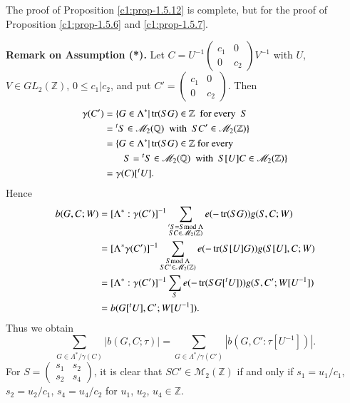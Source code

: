 The proof of Proposition \ref{c1:prop-1.5.12} is complete, but for the proof
of Proposition \ref{c1:prop-1.5.6} and \ref{c1:prop-1.5.7}.


\bigskip
\noindent
{\bf Remark on Assumption (*).}
Let $C=U^{-1}\left(\begin{smallmatrix} c_{1} & 0\\ 0 & c_{2}
\end{smallmatrix}\right)V^{-1}$ with $U$, $V\in GL_{2}(\mathbb{Z})$,
$0\leq c_{1}|c_{2}$, and put $C'=\left(\begin{smallmatrix} c_{1} &
  0\\ 0 & c_{2}\end{smallmatrix}\right)$. Then
\begin{align*}
\gamma(C') &= \{G\in\Lambda^{\ast}|\operatorname{tr}(SG)\in\mathbb{Z} \text{ \ for
  every \ } S\\
&={}^{t}S\in\mathscr{M}_{2}(\mathbb{Q})\text{ \ with \ }
SC'\in\mathscr{M}_{2}(\mathbb{Z})\}\\
&= \{G\in\Lambda^{\ast}|\operatorname{tr}(SG)\in\mathbb{Z}\text{  for every  }\\
&\qquad S={}^{t}S\in\mathscr{M}_{2}(\mathbb{Q})\text{ \ with \ }
S[U]C\in\mathscr{M}_{2}(\mathbb{Z})\}\\
&= \gamma(C)[{}^{t}U].
\end{align*}
Hence\pageoriginale
\begin{align*}
b(G,C;W) &=
[\Lambda^{\ast}:\gamma(C')]^{-1}\sum_{\substack{{}^{t}S=S\rm{mod} \;\Lambda\\ SC\in
\mathscr{M}_{2}(\mathbb{Z})}}e(-\operatorname{tr}(SG))g(S,C;W)\\
&=
[\Lambda^{\ast}\gamma(C')]^{-1}\sum_{\substack{S\rm{mod} \;\Lambda\\ SC'\in\mathscr{M}_{2}(\mathbb{Z})}}e(-\operatorname{tr}(S[U]G))g(S[U],C;W)\\
&=
[\Lambda^{\ast}:\gamma(C')]^{-1}\sum_{S}e(-\operatorname{tr}(SG[{}^{t}U]))g(S,C';W[U^{-1}])\\
&= b(G[{}^{t}U], C';W[U^{-1}]).
\end{align*}
Thus we obtain
$$
\sum_{G\in\Lambda^{\ast}/\gamma(C)}|b(G,C;\tau)|=\sum_{G\in\Lambda^{\ast}/\gamma(C')}|b(G,C':\tau[U^{-1}])|.
$$
For $S=\left(\begin{smallmatrix} s_{1} & s_{2}\\ s_{2} & s_{4}
\end{smallmatrix}\right)$, it is clear that
$SC'\in\mathscr{M}_{2}(\mathbb{Z})$ if and only if
$s_{1}=u_{1}/c_{1}$, $s_{2}=u_{2}/c_{1}$, $s_{4}=u_{4}/c_{2}$ for
$u_{1}$, $u_{2}$, $u_{4}\in \mathbb{Z}$.

